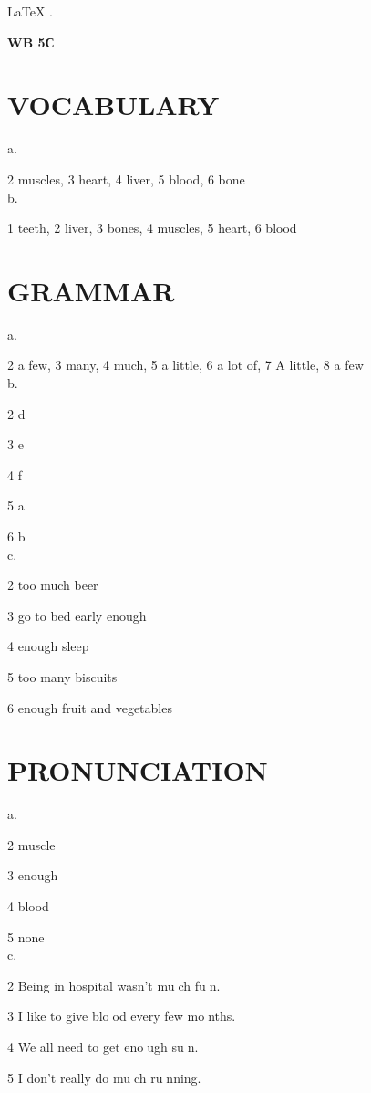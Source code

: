 \documentclass{article}
\begin{document}
\begin{center}
    \color{pink}
    \LARGE
    \LaTeX
    \color{lime}
    .
\end{center}

\textbf{WB 5С}

\section*{VOCABULARY}
    a.
    
    2 muscles, 3 heart, 4 liver, 5 blood,
    6 bone
    \\
    b.
    
    1 teeth, 2 liver, 3 bones, 4 muscles,
    5 heart, 6 blood
\section*{GRAMMAR}

a.

2 a few, 3 many, 4 much, 5 a little, 6 a lot of, 7 A little, 8 a few
\\
b.

2 d

3 e

4 f

5 a

6 b 
\\
c.

2 too much beer

3 go to bed early enough

4 enough sleep

5 too many biscuits

6 enough fruit and vegetables

\section*{PRONUNCIATION}
a.

2 muscle

3 enough

4 blood

5 none 
\\
c.

2 Being in hospital wasn't m\textcircled{u}ch f\textcircled{u}n.

3 I like to give bl\textcircled{oo}d every few m\textcircled{o}nths.

4 We all need to get en\textcircled{ou}gh s\textcircled{u}n.

5 I don't really do m\textcircled{u}ch r\textcircled{u}nning.
\end{document}
